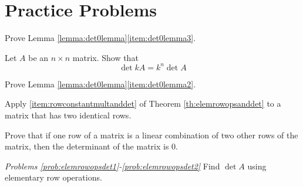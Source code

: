 \documentclass{ximera}
\begin{document}
\section*{Practice Problems}





\begin{problem}\label{prob:proofdet0lemma}
Prove Lemma \ref{lemma:det0lemma}\ref{item:det0lemma3}.
\end{problem}



\begin{problem}\label{prob:kAdet}
Let $A$ be an $n\times n$ matrix.  Show that 
$$\det{kA}=k^n\det{A}$$
\end{problem}

\begin{problem}\label{prob:proofdet0lemma2}
Prove Lemma \ref{lemma:det0lemma}\ref{item:det0lemma2}.
\begin{hint} 
Apply \ref{item:rowconstantmultanddet} of Theorem \ref{th:elemrowopsanddet} to a matrix that has two identical rows.
\end{hint}
\end{problem}


\begin{problem}\label{prob:onerowlincombanotherdet}
Prove that if one row of a matrix is a linear combination of two other rows of the matrix, then the determinant of the matrix is 0.
\end{problem}

\emph{Problems \ref{prob:elemrowopsdet1}-\ref{prob:elemrowopsdet2}}
Find $\det{A}$ using elementary row operations.
\end{document}
